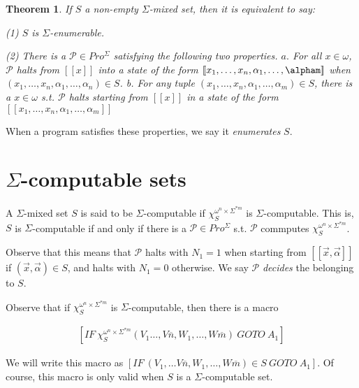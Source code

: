 \documentclass[a4paper, 12pt]{article}
\newtheorem{theorem}{Theorem}
\newtheorem{theorem}{Theorem}
\begin{document}
\begin{theorem}
    If $S$ a non-empty $\Sigma$-mixed set, then it is equivalent to say: 

    \textit{(1)} $S$ is $\Sigma$-enumerable. 

    \textit{(2)} There is a $\mathcal{P} \in Pro^{\Sigma}$ satisfying the
    following two properties. $a.$ For all $x \in \omega$, $\mathcal{P}$ halts
    from $[\![ x ]\!]$ into a state of the form $[\![ x_1, \ldots, x_n,
    \alpha_1, \ldots, \alpham ]\!]$ when $(x_1, \ldots, x_n, \alpha_1, \ldots,
    \alpha_n) \in S$. \textit{b.} For any tuple $(x_1, \ldots, x_n, \alpha_1, \ldots, \alpha_m) \in
S$, there is a $x \in \omega$ s.t. $\mathcal{P}$ halts starting from $[\![ x
]\!]$ in a state of the form $[\![ x_1, \ldots, x_n, \alpha_1, \ldots, \alpha_m ]\!]$ 

\end{theorem}

When a program satisfies these properties, we say it \textit{enumerates} $S$.

\section{$\Sigma$-computable sets}

A $\Sigma$-mixed set $S$ is said to be $\Sigma$-computable if
$\chi_{S}^{\omega^n \times \Sigma^{*m}}$ is $\Sigma$-computable. This is, $S$ is
$\Sigma$-computable if and only if there is a $\mathcal{P} \in Pro^{\Sigma}$
s.t. $\mathcal{P}$ commputes $\chi_S^{\omega^n \times \Sigma^{*m}}$. 

Observe that this means that $\mathcal{P}$ halts with $N_1 = 1$ when starting
from $[\![ \overrightarrow{x}, \overrightarrow{\alpha} ]\!]$ if
$(\overrightarrow{x}, \overrightarrow{\alpha}) \in S$, and halts with $N_1 = 0$
otherwise. We say $\mathcal{P}$ \textit{decides} the belonging to $S$.

Observe that if $\chi_S^{\omega^n \times \Sigma^{*m}}$ is $\Sigma$-computable,
then there is a macro 

\begin{align*}
    \left[ IF ~ \chi_S^{\omega^n \times \Sigma^{*m}} \left( V_1 \ldots, V
    \overline{n}, W_1, \ldots, W \overline{m} \right) ~ GOTO ~ A_1  \right] 
\end{align*}

We will write this macro as $\left[ IF ~ (V_1, \ldots V \overline{n}, W_1, \ldots,
W \overline{m}) \in S ~ GOTO ~ A_1 \right] $. Of course, this macro is only
valid when $S$ is a $\Sigma$-computable set.
\end{document}
